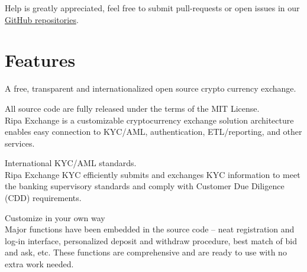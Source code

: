 \documentclass[11pt,fleqn]{book} %
\begin{document}
Help is greatly appreciated, feel free to submit pull-requests or open issues in our \href{https://github.com/RipaEx}{GitHub repositories}.

\section{Features}
A free, transparent and internationalized open source crypto currency exchange.

\begin{tcolorbox}[featureBox,
	title=\textsc{Open Source} \faCircleONotch]

	\small	All source code are fully released under the terms of the MIT License.\\\vspace{5mm}
	\tiny Ripa Exchange is a customizable cryptocurrency exchange solution architecture enables easy connection to KYC/AML, 
	authentication, ETL/reporting, and other services.
\end{tcolorbox}
\begin{tcolorbox}[featureBox,
	title=\textsc{Compliant} \faCheck]

	\small	International KYC/AML standards.\\\vspace{5mm}
	\tiny Ripa Exchange KYC efficiently submits and exchanges KYC information 
	to meet the banking supervisory standards and comply with Customer Due Diligence (CDD) requirements.
\end{tcolorbox}
\begin{tcolorbox}[featureBox,
	title=\textsc{Transparent \& Configurable} \faCogs]

	\small	Customize in your own way\\\vspace{5mm}
	\tiny Major functions have been embedded in the source code – neat registration and log-in interface, 
	personalized deposit and withdraw procedure, best match of bid and ask, etc. These functions are comprehensive 
	and are ready to use with no extra work needed. 
\end{tcolorbox}
\end{document}
